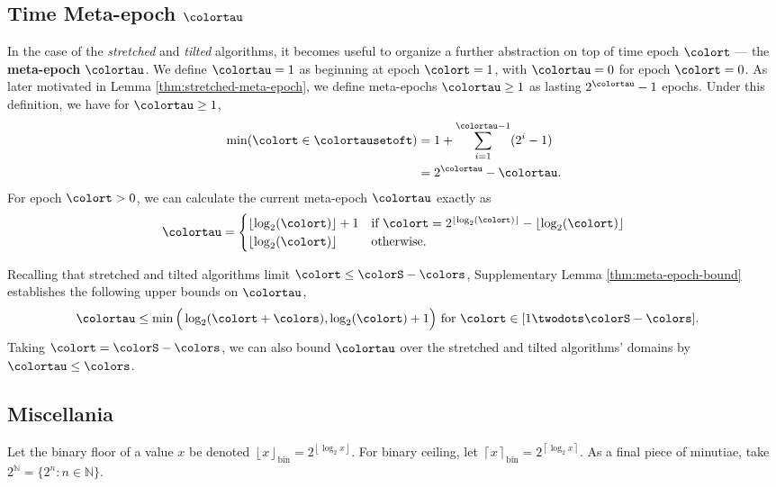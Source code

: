 \subsection{Time Meta-epoch $\colortau$}
\label{sec:notation-metaepoch}

In the case of the \textit{stretched} and \textit{tilted} algorithms, it becomes useful to organize a further abstraction on top of time epoch $\colort$ --- the \textbf{meta-epoch} $\colortau$.
We define $\colortau=1$ as beginning at epoch $\colort = 1$, with $\colortau=0$ for epoch $\colort=0$.
As later motivated in Lemma \ref{thm:stretched-meta-epoch}, we define meta-epochs $\colortau\geq1$ as lasting $2^{\colortau} - 1$ epochs.
Under this definition, we have for $\colortau\geq1$,
\begin{align}
\min(\colort \in \colortausetoft)
&= 1 + \sum_{i=1}^{\colortau - 1} (2^{i} - 1) \\
&= 2^{\colortau} - \colortau.
\label{eqn:meta-epoch-defn}
\end{align}
For epoch $\colort > 0$, we can calculate the current meta-epoch $\colortau$ exactly as
\begin{align*}
\colortau
=
\begin{cases}
\left\lfloor \log_2(\colort) \right\rfloor + 1 & \text{if } \colort = 2^{\left\lfloor \log_2(\colort) \right\rfloor} - \left\lfloor \log_2(\colort) \right\rfloor \\
\left\lfloor \log_2(\colort) \right\rfloor & \text{otherwise.}
\end{cases}
\end{align*}

Recalling that stretched and tilted algorithms limit $\colort \leq \colorS - \colors$, Supplementary Lemma \ref{thm:meta-epoch-bound} establishes the following upper bounds on $\colortau$,
\begin{align*}
\colortau
&\leq
\min\Big(
  \log_2(\colort + \colors),
  \log_2(\colort) + 1
\Big)
\text{ for } \colort \in [1 \twodots \colorS - \colors].
\end{align*}
Taking $\colort = \colorS - \colors$, we can also bound $\colortau$ over the stretched and tilted algorithms' domains by $\colortau \leq \colors$.

\subsection{Miscellania}

Let the binary floor of a value $x$ be denoted $\left\lfloor x \right\rfloor_\mathrm{bin} = 2^{\left\lfloor \log_2 x \right\rfloor}$.
For binary ceiling, let $\left\lceil x \right\rceil_\mathrm{bin} = 2^{\left\lceil \log_2 x \right\rceil}$.
As a final piece of minutiae, take $2^{\mathbb{N}} = \{2^n : n \in \mathbb{N} \}$.
